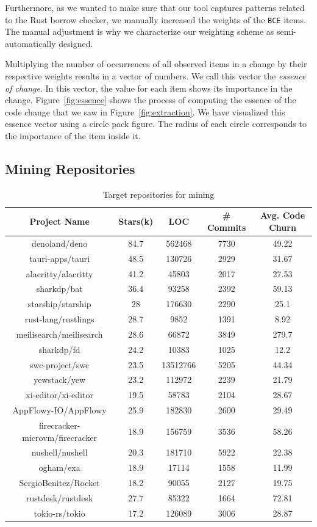 Furthermore, as we wanted to make sure that our tool captures patterns related to the Rust borrow checker, we manually increased the weights of the \texttt{BCE} items. The manual adjustment is why we characterize our weighting scheme as semi-automatically designed. 

Multiplying the number of occurrences of all observed items in a change by their respective weights results in a vector of numbers. We call this vector the \emph{essence of change}. In this vector, the value for each item shows its importance in the change. Figure~\ref{fig:essence} shows the process of computing the essence of the code change that we saw in Figure~\ref{fig:extraction}. We have visualized this essence vector using a circle pack figure. The radius of each circle corresponds to the importance of the item inside it.

\subsection{\label{sec:mining_repositories}Mining Repositories}

\begin{table}
\caption{\label{table:repos} Target repositories for mining}
\begin{tabular}{c|c|c|c|c}
    Project Name & Stars(k) & LOC & \# Commits & Avg. Code Churn \\ \hline
    denoland/deno & 84.7 & 562468 & 7730 & 49.22 \\ \hline
    tauri-apps/tauri & 48.5 & 130726 & 2929 & 31.67 \\ \hline
    alacritty/alacritty & 41.2 & 45803 & 2017 & 27.53 \\ \hline
    sharkdp/bat & 36.4 & 93258 & 2392 & 59.13 \\ \hline
    starship/starship & 28 & 176630 & 2290 & 25.1 \\ \hline
    rust-lang/rustlings & 28.7 & 9852 & 1391 & 8.92 \\ \hline
    meilisearch/meilisearch & 28.6 & 66872 & 3849 & 279.7 \\ \hline
    sharkdp/fd & 24.2 & 10383 & 1025 & 12.2 \\ \hline
    swc-project/swc & 23.5 & 13512766 & 5205 & 44.34 \\ \hline
    yewstack/yew & 23.2 & 112972 & 2239 & 21.79 \\ \hline
    xi-editor/xi-editor & 19.5 & 58783 & 2104 & 28.67 \\ \hline
    AppFlowy-IO/AppFlowy & 25.9 & 182830 & 2600 & 29.49 \\ \hline
    firecracker-microvm/firecracker & 18.9 & 156759 & 3536 & 58.26 \\ \hline
    nushell/nushell & 20.3 & 181710 & 5922 & 22.38 \\ \hline
    ogham/exa & 18.9 & 17114 & 1558 & 11.99 \\ \hline
    SergioBenitez/Rocket & 18.2 & 90055 & 2127 & 19.75 \\ \hline
    rustdesk/rustdesk & 27.7 & 85322 & 1664 & 72.81 \\ \hline
    tokio-rs/tokio & 17.2 & 126089 & 3006 & 28.87 
\end{tabular}
\end{table}
   


